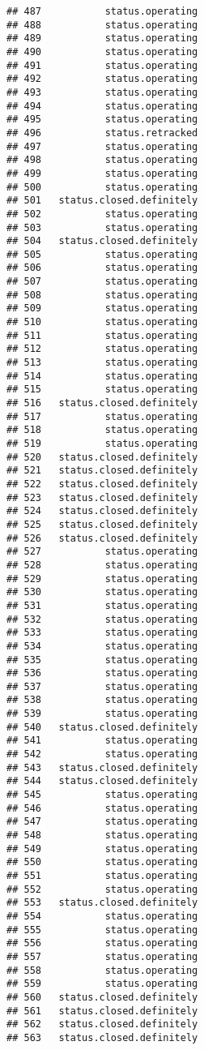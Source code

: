 \documentclass[
]{article}
\begin{document}
\begin{verbatim}
## 487           status.operating
## 488           status.operating
## 489           status.operating
## 490           status.operating
## 491           status.operating
## 492           status.operating
## 493           status.operating
## 494           status.operating
## 495           status.operating
## 496           status.retracked
## 497           status.operating
## 498           status.operating
## 499           status.operating
## 500           status.operating
## 501   status.closed.definitely
## 502           status.operating
## 503           status.operating
## 504   status.closed.definitely
## 505           status.operating
## 506           status.operating
## 507           status.operating
## 508           status.operating
## 509           status.operating
## 510           status.operating
## 511           status.operating
## 512           status.operating
## 513           status.operating
## 514           status.operating
## 515           status.operating
## 516   status.closed.definitely
## 517           status.operating
## 518           status.operating
## 519           status.operating
## 520   status.closed.definitely
## 521   status.closed.definitely
## 522   status.closed.definitely
## 523   status.closed.definitely
## 524   status.closed.definitely
## 525   status.closed.definitely
## 526   status.closed.definitely
## 527           status.operating
## 528           status.operating
## 529           status.operating
## 530           status.operating
## 531           status.operating
## 532           status.operating
## 533           status.operating
## 534           status.operating
## 535           status.operating
## 536           status.operating
## 537           status.operating
## 538           status.operating
## 539           status.operating
## 540   status.closed.definitely
## 541           status.operating
## 542           status.operating
## 543   status.closed.definitely
## 544   status.closed.definitely
## 545           status.operating
## 546           status.operating
## 547           status.operating
## 548           status.operating
## 549           status.operating
## 550           status.operating
## 551           status.operating
## 552           status.operating
## 553   status.closed.definitely
## 554           status.operating
## 555           status.operating
## 556           status.operating
## 557           status.operating
## 558           status.operating
## 559           status.operating
## 560   status.closed.definitely
## 561   status.closed.definitely
## 562   status.closed.definitely
## 563   status.closed.definitely

\end{verbatim}
\end{document}
